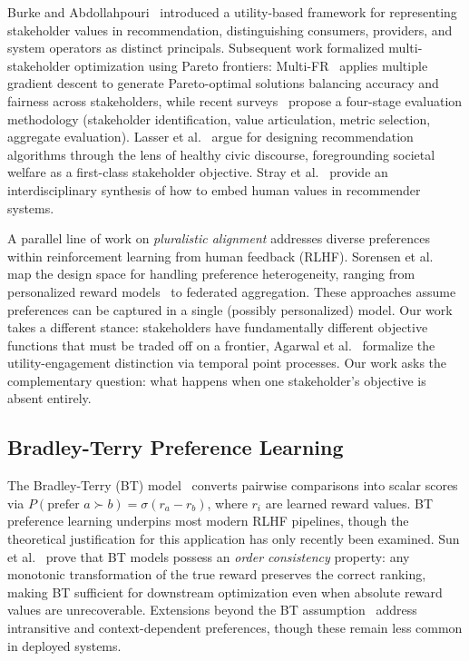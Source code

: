 \documentclass[11pt,letterpaper]{article}
\begin{document}
Burke and Abdollahpouri~\cite{burke2017multistakeholder} introduced a
utility-based framework for representing stakeholder values in
recommendation, distinguishing consumers, providers, and system
operators as distinct principals. Subsequent work formalized
multi-stakeholder optimization using Pareto frontiers:
Multi-FR~\cite{multifr2022} applies multiple gradient descent to
generate Pareto-optimal solutions balancing accuracy and fairness
across stakeholders, while recent surveys~\cite{eval2025multistakeholder}
propose a four-stage evaluation methodology (stakeholder identification,
value articulation, metric selection, aggregate evaluation).
Lasser et al.~\cite{lasser2025designing} argue for designing
recommendation algorithms through the lens of healthy civic discourse,
foregrounding societal welfare as a first-class stakeholder objective. Stray et al.~\cite{stray2024building} provide an interdisciplinary synthesis of how to embed human values in recommender systems.

A parallel line of work on \emph{pluralistic alignment} addresses
diverse preferences within reinforcement learning from human feedback
(RLHF). Sorensen et al.~\cite{sorensen2024roadmap} map the design
space for handling preference heterogeneity, ranging from personalized
reward models~\cite{pad2025personalized} to federated
aggregation. These approaches assume preferences can be captured in a
single (possibly personalized) model. Our work takes a different
stance: stakeholders have fundamentally different objective functions
that must be traded off on a frontier, Agarwal et al.~\cite{agarwal2024system2} formalize the utility-engagement distinction via temporal point processes. Our work asks the complementary question:
what happens when one stakeholder's objective is absent entirely.

\subsection{Bradley-Terry Preference Learning}

The Bradley-Terry (BT) model~\cite{bradley1952rank} converts pairwise
comparisons into scalar scores via
$P(\text{prefer } a \succ b) = \sigma(r_a - r_b)$, where $r_i$ are
learned reward values. BT preference learning underpins most modern
RLHF pipelines, though the theoretical justification for this
application has only recently been examined. Sun
et al.~\cite{sun2025rethinking} prove that BT models possess an
\emph{order consistency} property: any monotonic transformation of
the true reward preserves the correct ranking, making BT sufficient
for downstream optimization even when absolute reward values are
unrecoverable. Extensions beyond the BT
assumption~\cite{beyondbt2025} address intransitive and
context-dependent preferences, though these remain less common in
deployed systems.
\end{document}
